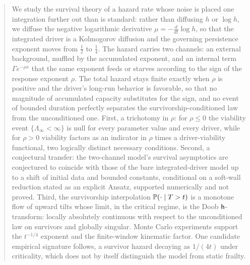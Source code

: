 \begin{abstract}
We study the survival theory of a hazard rate whose noise is placed one integration further out than is standard: rather than diffusing $h$ or $\log h$, we diffuse the negative logarithmic derivative $\mu=-\frac{d}{dt}\log h$, so that the integrated driver is a Kolmogorov diffusion and the governing persistence exponent moves from $\tfrac12$ to $\tfrac14$. The hazard carries two channels: an external background, muffled by the accumulated exponent, and an internal term $\Gamma e^{-\rho x}$ that the same exponent feeds or starves according to the sign of the response exponent $\rho$. The total hazard stays finite exactly when $\rho$ is positive and the driver's long-run behavior is favorable, so that no magnitude of accumulated capacity substitutes for the sign, and no event of bounded duration perfectly separates the survivorship-conditioned law from the unconditioned one. First, a trichotomy in $\rho$: for $\rho\le0$ the viability event $\{\Lambda_\infty<\infty\}$ is null for every parameter value and every driver, while for $\rho>0$ viability factors as an indicator in $\rho$ times a driver-viability functional, two logically distinct necessary conditions. Second, a conjectural transfer: the two-channel model's survival asymptotics are conjectured to coincide with those of the bare integrated-driver model up to a shift of initial data and bounded constants, conditional on a soft-wall reduction stated as an explicit Ansatz, supported numerically and not proved. Third, the survivorship interpolation $\PP(\cdot\mid T>t)$ is a monotone flow of upward tilts whose limit, in the critical regime, is the Doob $\hm$-transform: locally absolutely continuous with respect to the unconditioned law on survivors and globally singular. Monte Carlo experiments support the $t^{-1/4}$ exponent and the finite-window kinematic factor. One candidate empirical signature follows, a survivor hazard decaying as $1/(4t)$ under criticality, which does not by itself distinguish the model from static frailty.

\end{abstract}
